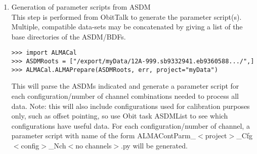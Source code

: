 \documentclass[11pt]{article}
\begin{document}
\begin{enumerate}
\item Generation of parameter scripts from ASDM\\
This step is performed from ObitTalk to generate the parameter
script(s).
Multiple, compatible data-sets may be concatenated by giving a list of
the base directories of the ASDM/BDFs.
\begin{verbatim}
>>> import ALMACal
>>> ASDMRoots = ["/export/myData/12A-999.sb9332941.eb9360588.../",]
>>> ALMACal.ALMAPrepare(ASDMRoots, err, project="myData")
\end{verbatim}
This will parse the ASDMs indicated and generate a parameter script for
each configuration/number of channel combinations needed to process
all data.
Note: this will also include configurations used for calibration
purposes only, such as offset pointing, so use Obit task ASDMList to see
which configurations have useful data.
For each configuration/number of channel, a parameter script with name
of the form ALMAContParm\_$<$project$>$\_Cfg$<$config$>$\_Nch$<$no channels$>$.py
will be generated.


\end{enumerate}
\end{document}
